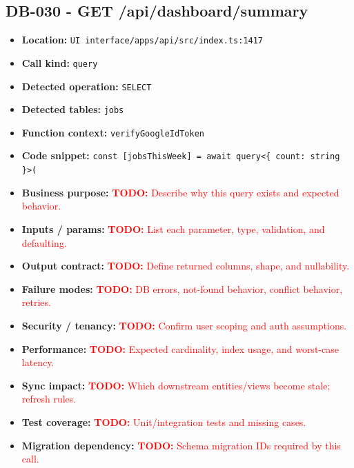 \documentclass[11pt]{article}
\newcommand{\todoitem}[1]{\textcolor{red}{\textbf{TODO:} #1}}
\begin{document}
\subsection{DB-030 - GET /api/dashboard/summary}
\begin{itemize}[leftmargin=1.5em]
\item \textbf{Location:} \texttt{UI interface/apps/api/src/index.ts:1417}
\item \textbf{Call kind:} \texttt{query}
\item \textbf{Detected operation:} \texttt{SELECT}
\item \textbf{Detected tables:} \texttt{jobs}
\item \textbf{Function context:} \texttt{verifyGoogleIdToken}
\item \textbf{Code snippet:} \texttt{const [jobsThisWeek] = await query<\{ count: string \}>(}
\item \textbf{Business purpose:} \todoitem{Describe why this query exists and expected behavior.}
\item \textbf{Inputs / params:} \todoitem{List each parameter, type, validation, and defaulting.}
\item \textbf{Output contract:} \todoitem{Define returned columns, shape, and nullability.}
\item \textbf{Failure modes:} \todoitem{DB errors, not-found behavior, conflict behavior, retries.}
\item \textbf{Security / tenancy:} \todoitem{Confirm user scoping and auth assumptions.}
\item \textbf{Performance:} \todoitem{Expected cardinality, index usage, and worst-case latency.}
\item \textbf{Sync impact:} \todoitem{Which downstream entities/views become stale; refresh rules.}
\item \textbf{Test coverage:} \todoitem{Unit/integration tests and missing cases.}
\item \textbf{Migration dependency:} \todoitem{Schema migration IDs required by this call.}
\end{itemize}
\end{document}
